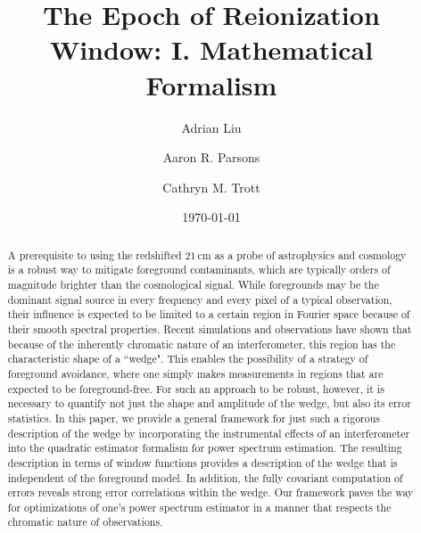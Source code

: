 \documentclass[twocolumn,aps,prd,nofootinbib,showpacs]{revtex4-1}
\begin{document}
\title{The Epoch of Reionization Window: I. Mathematical Formalism}

\author{Adrian Liu}
\author{Aaron R. Parsons}
\author{Cathryn M. Trott}

\date{\today}

\newcommand{\apjs}{Astrophys. J. Suppl. Ser.}
\newcommand{\aj}{Astron. J.}
\newcommand{\mnras}{Mon. Not. R. Astron. Soc.}
\newcommand{\apjl}{Astrophys. J. Lett.}
\newcommand{\aap}{Astron. Astrophys.}
\newcommand{\pasa}{PASA}
\newcommand{\physrep}{Phys. Rep.}
\newcommand{\araa}{Annu. Rev. Astron. Astrophys.}



\begin{abstract}
A prerequisite to using the redshifted $21\,\textrm{cm}$ as a probe of astrophysics and cosmology is a robust way to mitigate foreground contaminants, which are typically orders of magnitude brighter than the cosmological signal.  While foregrounds may be the dominant signal source in every frequency and every pixel of a typical observation, their influence is expected to be limited to a certain region in Fourier space because of their smooth spectral properties.  Recent simulations and observations have shown that because of the inherently chromatic nature of an interferometer, this region has the characteristic shape of a ``wedge".  This enables the possibility of a strategy of foreground avoidance, where one simply makes measurements in regions that are expected to be foreground-free.  For such an approach to be robust, however, it is necessary to quantify not just the shape and amplitude of the wedge, but also its error statistics.  In this paper, we provide a general framework for just such a rigorous description of the wedge by incorporating the instrumental effects of an interferometer into the quadratic estimator formalism for power spectrum estimation.  The resulting description in terms of window functions provides a description of the wedge that is independent of the foreground model.  In addition, the fully covariant computation of errors reveals strong error correlations within the wedge.  Our framework paves the way for optimizations of one's power spectrum estimator in a manner that respects the chromatic nature of observations.
\end{abstract}
\end{document}
